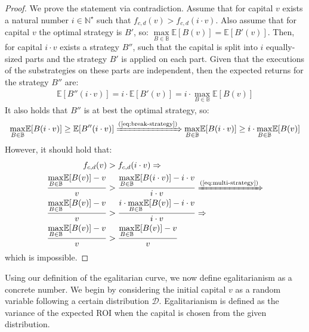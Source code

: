 \begin{proof}
    We prove the statement via contradiction. Assume that for capital $v$
    exists a natural number $i \in \mathbb{N}^\star$ such that
    $f_{c,d}(v) > f_{c,d}(i \cdot v)$. Also assume that for
    capital $v$ the optimal strategy is $B'$, so: $\underset{B \in
    \mathbb{B}}{\max}{\mathbb{E}[B(v)]} = \mathbb{E}[B'(v)]$. Then, for capital
    $i \cdot v$ exists a strategy $B''$, such that the capital is split into $i$
    equally-sized parts and the strategy $B'$ is applied on each part. Given
    that the executions of the substrategies on these parts are independent,
    then the expected returns for the strategy $B''$ are:
    \begin{align}\label{eq:break-strategy}
        \mathbb{E}[B''(i \cdot v)] = i \cdot \mathbb{E}[B'(v)]  = i \cdot \underset{B \in \mathbb{B}}{\max}{\mathbb{E}[B(v)]}
    \end{align}
    It also holds that $B''$ is at best the optimal strategy, so:
    \begin{align}\label{eq:multi-strategy}
        \underset{B \in \mathbb{B}}{\max}{\mathbb{E}[B(i \cdot v)]} \geq \mathbb{E}[B''(i \cdot v)] \xRightarrow{\text{(\ref{eq:break-strategy})}}
        \underset{B \in \mathbb{B}}{\max}{\mathbb{E}[B(i \cdot v)]} \geq i \cdot \underset{B \in \mathbb{B}}{\max}{\mathbb{E}[B(v)]}
    \end{align}
    However, it should hold that:
    \begin{alignat}{2}
        f_{c,d}(v) &> f_{c,d}(i \cdot v) \Rightarrow \notag\\
        \frac{\underset{B \in \mathbb{B}}{\max}{\mathbb{E}[B(v)]} - v}{v} &> \frac{\underset{B \in \mathbb{B}}{\max}{\mathbb{E}[B(i \cdot v)]} - i \cdot v}{i \cdot v} \xRightarrow{\text{(\ref{eq:multi-strategy})}} \notag\\
        \frac{\underset{B \in \mathbb{B}}{\max}{\mathbb{E}[B(v)]} - v}{v} &> \frac{i \cdot \underset{B \in \mathbb{B}}{\max}{\mathbb{E}[B(v)]} - i \cdot v}{i \cdot v} \Rightarrow \notag\\
        \frac{\underset{B \in \mathbb{B}}{\max}{\mathbb{E}[B(v)]} - v}{v} &> \frac{\underset{B \in \mathbb{B}}{\max}{\mathbb{E}[B(v)]} - v}{v}
    \end{alignat}
    which is impossible.
\end{proof}

Using our definition of the egalitarian curve, we now define egalitarianism as
a concrete number. We begin by considering the initial capital $v$ as a random
variable following a certain distribution $\mathcal{D}$. Egalitarianism is
defined as the variance of the expected ROI when the capital is chosen from the
given distribution.

